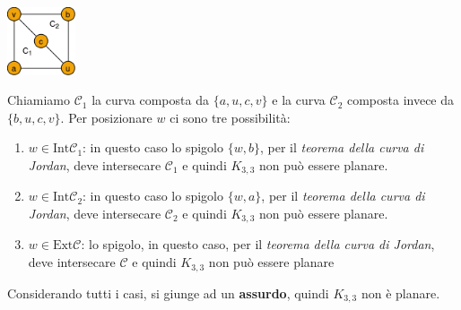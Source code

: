 \begin{flushleft}
\begin{boxA}
        {\centering
            \includegraphics[width=0.15\textwidth]{img/k33_2}
        \par}
        Chiamiamo $\mathcal{C}_1$ la curva composta da $\{a, u, c, v\}$ e la curva $\mathcal{C}_2$ composta invece da $\{b, u, c, v\}$. Per posizionare $w$ ci sono tre possibilità: 
        \begin{enumerate}[nosep]
            \item $w \in \text{Int}\mathcal{C}_1$: in questo caso lo spigolo $\{w, b\}$, per il \textit{teorema della curva di Jordan}, deve intersecare $\mathcal{C}_1$ e quindi $K_{3,3}$ non può essere planare.
            \item $w \in \text{Int}\mathcal{C}_2$: in questo caso lo spigolo $\{w, a\}$, per il \textit{teorema della curva di Jordan}, deve intersecare $\mathcal{C}_2$ e quindi $K_{3,3}$ non può essere planare.
            \item $w \in \text{Ext}\mathcal{C}$: lo spigolo, in questo caso, per il \textit{teorema della curva di Jordan}, deve intersecare $\mathcal{C}$ e quindi $K_{3,3}$ non può essere planare
        \end{enumerate}
        Considerando tutti i casi, si giunge ad un \textbf{assurdo}, quindi $K_{3,3}$ non è planare.
    \end{boxA}
\end{flushleft}

